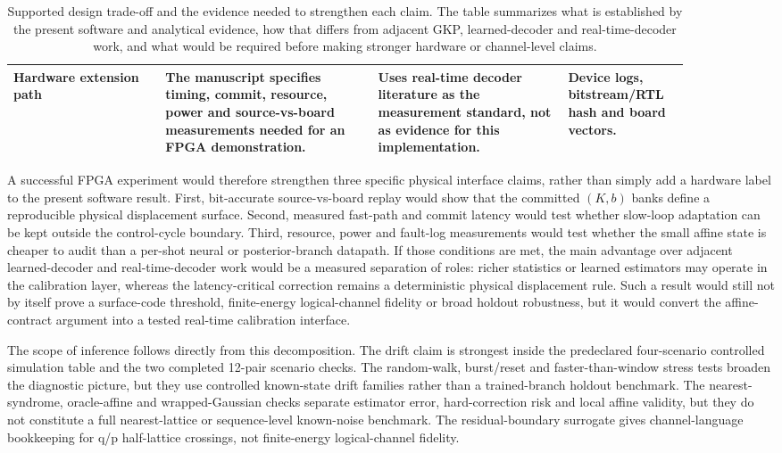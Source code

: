 \documentclass[11pt]{article}
\newcommand{\softwarehil}{controlled simulation}
\begin{document}
\begin{table}[t]
\begin{tabular}{@{}>{\raggedright\arraybackslash}p{0.20\linewidth}>{\raggedright\arraybackslash}p{0.28\linewidth}>{\raggedright\arraybackslash}p{0.25\linewidth}>{\raggedright\arraybackslash}p{0.15\linewidth}@{}}
\addlinespace
Hardware extension path &
The manuscript specifies timing, commit, resource, power and source-vs-board
measurements needed for an FPGA demonstration. &
Uses real-time decoder literature as the measurement standard, not as evidence
for this implementation. &
Device logs, bitstream/RTL hash and board vectors. \\
\bottomrule
\end{tabular}
\caption{Supported design trade-off and the evidence needed to strengthen
each claim.  The table summarizes what is established by the present software
and analytical evidence, how that differs from adjacent GKP, learned-decoder and
real-time-decoder work, and what would be required before making stronger
hardware or channel-level claims.}
\label{tab:supported-advantage}
\end{table}

A successful FPGA experiment would therefore strengthen three specific physical
interface claims, rather than simply add a hardware label to the present
software result.  First, bit-accurate source-vs-board replay would show that
the committed \((K,b)\) banks define a reproducible physical displacement
surface.  Second, measured fast-path and commit latency would test whether
slow-loop adaptation can be kept outside the control-cycle boundary.  Third,
resource, power and fault-log measurements would test whether the small affine
state is cheaper to audit than a per-shot neural or posterior-branch datapath.
If those conditions are met, the main advantage over adjacent learned-decoder
and real-time-decoder work would be a measured separation of roles: richer
statistics or learned estimators may operate in the calibration layer, whereas
the latency-critical correction remains a deterministic physical displacement
rule.  Such a result would still not by itself prove a surface-code threshold,
finite-energy logical-channel fidelity or broad holdout robustness, but it
would convert the affine-contract argument into a tested real-time calibration
interface.

The scope of inference follows directly from this decomposition.  The drift
claim is strongest inside the predeclared four-scenario \softwarehil{} table
and the two completed 12-pair scenario checks.  The random-walk, burst/reset
and faster-than-window stress tests broaden the diagnostic picture, but they
use controlled known-state drift families rather than a trained-branch holdout
benchmark.  The nearest-syndrome, oracle-affine and wrapped-Gaussian checks
separate estimator error, hard-correction risk and local affine validity, but
they do not constitute a full nearest-lattice or sequence-level known-noise benchmark.
The residual-boundary surrogate gives channel-language bookkeeping for q/p
half-lattice crossings, not finite-energy logical-channel fidelity.
\end{document}
